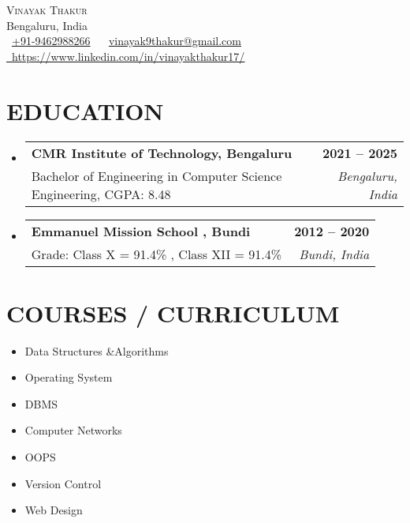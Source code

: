 \documentclass[letterpaper,8pt]{article}
\makeatletter
\newcommand{\resumeSubheading}[4]{
  \vspace{-2pt}\item
    \begin{tabular*}{1.0\textwidth}[t]{l@{\extracolsep{\fill}}r}
      \textbf{\large#1} & \textbf{\small #2} \\
      \large#3 & \textit{\small #4} \\
      
    \end{tabular*}\vspace{-7pt}
}
\newcommand{\resumeSubHeadingListStart}{\begin{itemize}[leftmargin=0.0in, label={}]}
\newcommand{\resumeSubHeadingListEnd}{\end{itemize}}
\makeatother
\begin{document}


\begin{center}
    {\Huge \scshape Vinayak Thakur } \\ \vspace{1pt}
     Bengaluru, India \\ \vspace{1pt}
    \small  \raisebox{-0.1\height}\faPhone\ \underline{+91-9462988266} ~ \raisebox{-0.2\height}\faEnvelope\  \underline{vinayak9thakur@gmail.com} ~ 
    \href{https://www.linkedin.com/in/vinayakthakur17/}{\raisebox{-0.2\height}\faLinkedinSquare\ \underline{https://www.linkedin.com/in/vinayakthakur17/}}  ~
    \vspace{-4pt}
\end{center}


\section{EDUCATION}
  \resumeSubHeadingListStart
    \resumeSubheading
      {CMR Institute of Technology, Bengaluru }{ 2021 -- 2025}
      {Bachelor of Engineering in Computer Science Engineering, CGPA: 8.48}{Bengaluru, India}
  \resumeSubHeadingListEnd
  \resumeSubHeadingListStart
    \resumeSubheading
      {Emmanuel Mission School , Bundi }{2012 -- 2020}
      {Grade: Class X = 91.4\% , Class XII = 91.4\% }{Bundi, India}
  \resumeSubHeadingListEnd

\section{COURSES / CURRICULUM }
        \begin{multicols}{4}
            \begin{itemize}[itemsep=-2pt, parsep=5pt]
                \item Data Structures \&Algorithms
                \item Operating System
                \item DBMS
                \item Computer Networks
                \item OOPS
                \item Version Control
                \item Web Design

            \end{itemize}
        \end{multicols}
        \vspace*{2.0\multicolsep}
\end{document}
